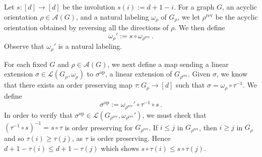 \documentclass[11pt]{amsart}
\newcommand{\rev}[1]{#1^{\mathrm{rev}}}
\newcommand{\op}[1]{#1^{\mathrm{op}}}
\newcommand{\acyclic}[1]{\mathcal{A}(#1)}
\newcommand{\jhset}[1]{\mathcal{L}(#1)}
\begin{document}
Let $s:[d] \to [d]$ be the involution $s(i) := d+1 - i$.
For a graph $G$, an acyclic orientation $\rho \in \acyclic{G}$, and a natural labeling $\omega_\rho$ of $G_\rho$, we let $\rev{\rho}$ be the acyclic orientation obtained by reversing all the directions of $\rho$.
We then define
\[
\omega_\rho' :=s \circ \omega_{\rev{\rho}} \, .
\]
    Observe that $\omega_\rho'$ is a natural labeling. %

For each fixed $G$ and $\rho\in \acyclic{G}$, we next define a map sending a linear extension $\sigma \in \jhset{G_\rho,\omega_\rho}$ to $\op{\sigma}$, a linear extension of $G_{\rev{\rho}}$.
   Given $\sigma$, we know that there exists an order preserving map $\tau:G_\rho \to [d]$ such that $\sigma = \omega_\rho \circ \tau^{-1}$.
    We define 
    \[
    \op{\sigma}:= \omega_{\rev{\rho}}' \circ \tau^{-1} \circ s \, .
    \]
    In order to verify that $\op{\sigma} \in \jhset{G_{\rev{\rho}},\omega_{\rev{\rho}}'}$, we must check that $(\tau^{-1} \circ s)^{-1} = s \circ \tau$ is order preserving for $G_{\rev{\rho}}$. 
    If $i \leq j$ in $G_{\rev{\rho}}$, then $i \geq j$ in $G_\rho$ and so $\tau(i) \geq \tau(j)$, as $\tau$ is order preserving. Hence $d+1-\tau(i) \leq d+1 - \tau(j)$ which shows $s \circ \tau(i) \leq s \circ \tau(j)$. 
\end{document}
